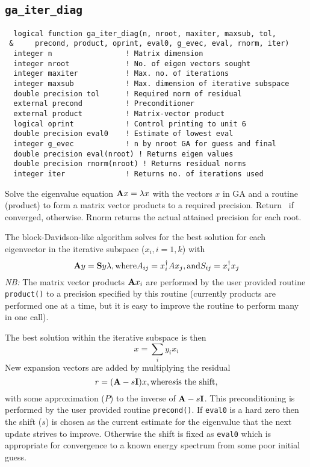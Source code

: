 \subsection{{\tt ga\_iter\_diag}}
\begin{verbatim}
  logical function ga_iter_diag(n, nroot, maxiter, maxsub, tol,
 &     precond, product, oprint, eval0, g_evec, eval, rnorm, iter)
  integer n                 ! Matrix dimension
  integer nroot             ! No. of eigen vectors sought
  integer maxiter           ! Max. no. of iterations
  integer maxsub            ! Max. dimension of iterative subspace
  double precision tol      ! Required norm of residual
  external precond          ! Preconditioner
  external product          ! Matrix-vector product
  logical oprint            ! Control printing to unit 6
  double precision eval0    ! Estimate of lowest eval
  integer g_evec            ! n by nroot GA for guess and final
  double precision eval(nroot) ! Returns eigen values
  double precision rnorm(nroot) ! Returns residual norms
  integer iter              ! Returns no. of iterations used
\end{verbatim}
  Solve the eigenvalue equation ${\bf A}x = \lambda x$ with the
vectors $x$ in GA and a routine (product) to form a matrix vector
products to a required precision.  Return \TRUE\ if converged, \FALSE
otherwise. Rnorm returns the actual attained precision for each root.
     
The block-Davidson-like algorithm solves for the best solution for
each eigenvector in the iterative subspace ($x_i, i = 1, k$) with
\begin{displaymath}
  {\bf A} y = {\bf S}y\lambda, \mbox{where} A_{ij} = x_i^{\dagger} A x_j,
\mbox{and} S_{ij} = x_i^{\dagger} x_j
\end{displaymath}
 {\em NB:} The matrix vector products ${\bf A}x_i$ are performed by the user
provided routine \verb+product()+ to a precision specified by this routine
(currently products are performed one at a time, but it is easy to
improve the routine to perform many in one call).
     
The best solution within the iterative subspace is then
\begin{displaymath}
  x = \sum_i y_i x_i
\end{displaymath}
New expansion vectors are added by multiplying the residual
\begin{displaymath}
  r = ({\bf A} - s {\bf I}) x, \mbox{where} s \mbox{is the shift},
\end{displaymath}
with some approximation ($P$) to the inverse of ${\bf A}-s{\bf I}$.
This preconditioning is performed by the user provided routine
\verb+precond()+.  If \verb+eval0+ is a hard zero then the shift ($s$) is
chosen as the current estimate for the eigenvalue that the next update
strives to improve.  Otherwise the shift is fixed as \verb+eval0+
which is appropriate for convergence to a known energy spectrum from
some poor initial guess.
     
